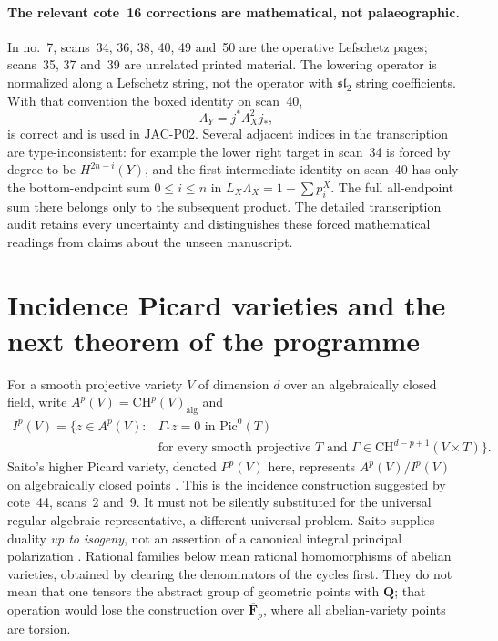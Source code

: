 \documentclass[11pt,a4paper]{article}
\begin{document}
\paragraph{The relevant cote~16 corrections are mathematical, not palaeographic.}
In no.~7, scans~34, 36, 38, 40, 49 and~50 are the operative
Lefschetz pages; scans~35, 37 and~39 are unrelated printed
material. The lowering operator is normalized along a Lefschetz
string, not the operator with $\mathfrak{sl}_2$ string
coefficients. With that convention the boxed identity on scan~40,
\[
             \Lambda_Y=j^*\Lambda_X^2j_*,
\]
is correct and is used in JAC-P02. Several adjacent indices in
the transcription are type-inconsistent: for example the lower
right target in scan~34 is forced by degree to be
$H^{2n-i}(Y)$, and the first intermediate identity on scan~40
has only the bottom-endpoint sum $0\le i\le n$ in
$L_X\Lambda_X=1-\sum p_i^X$. The full all-endpoint sum there
belongs only to the subsequent product. The detailed
transcription audit retains every uncertainty and distinguishes
these forced mathematical readings from claims about the
unseen manuscript.


\section{Incidence Picard varieties and the next theorem of the programme}

For a smooth projective variety $V$ of dimension $d$ over an algebraically
closed field, write $A^p(V)=\mathrm{CH}^p(V)_{\mathrm{alg}}$ and
\[
\begin{split}
 I^p(V)=\{z\in A^p(V):{}&\Gamma_*z=0\text{ in }\mathrm{Pic}^0(T)\\
 &\text{for every smooth projective }T\text{ and }
 \Gamma\in\mathrm{CH}^{d-p+1}(V\times T)\}.
\end{split}
\]
Saito's higher Picard variety, denoted $P^p(V)$ here, represents
$A^p(V)/I^p(V)$ on algebraically closed points
\cite[Theorem~(3.6)(i)]{Saito1979}.
This is the incidence construction suggested by cote~44, scans~2 and~9.
It must not be silently substituted for the universal regular algebraic
representative, a different universal problem.  Saito supplies duality
\emph{up to isogeny}, not an assertion of a canonical integral principal
polarization \cite[Proposition~(4.4)]{Saito1979}.
Rational families below mean rational homomorphisms of abelian varieties,
obtained by clearing the denominators of the cycles first.  They do not
mean that one tensors the abstract group of geometric points with
$\mathbf Q$; that operation would lose the construction over
$\overline{\mathbf F}_p$, where all abelian-variety points are torsion.
\end{document}
